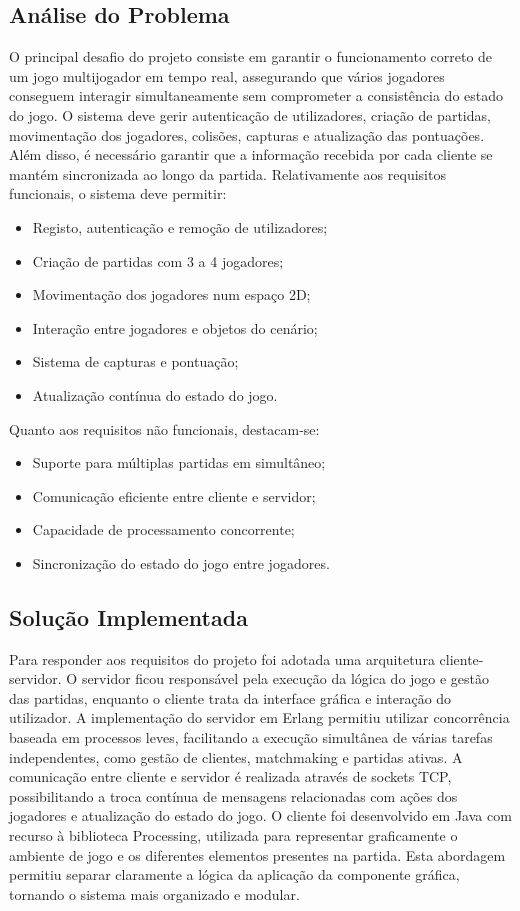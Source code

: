 \documentclass[11pt,a4paper]{article}
\begin{document}
\subsection{Análise do Problema}
O principal desafio do projeto consiste em garantir o funcionamento correto de um jogo multijogador em tempo real, assegurando que vários jogadores conseguem interagir simultaneamente sem comprometer a consistência do estado do jogo.
O sistema deve gerir autenticação de utilizadores, criação de partidas, movimentação dos jogadores, colisões, capturas e atualização das pontuações. Além disso, é necessário garantir que a informação recebida por cada cliente se mantém sincronizada ao longo da partida.
Relativamente aos requisitos funcionais, o sistema deve permitir:
\begin{itemize}
    \item Registo, autenticação e remoção de utilizadores;
    \item Criação de partidas com 3 a 4 jogadores;
    \item Movimentação dos jogadores num espaço 2D;
    \item Interação entre jogadores e objetos do cenário;
    \item Sistema de capturas e pontuação;
    \item Atualização contínua do estado do jogo.
\end{itemize}
Quanto aos requisitos não funcionais, destacam-se:
\begin{itemize}
    \item Suporte para múltiplas partidas em simultâneo;
    \item Comunicação eficiente entre cliente e servidor;
    \item Capacidade de processamento concorrente;
    \item Sincronização do estado do jogo entre jogadores.
\end{itemize}



\subsection{Solução Implementada}
Para responder aos requisitos do projeto foi adotada uma arquitetura cliente-servidor. O servidor ficou responsável pela execução da lógica do jogo e gestão das partidas, enquanto o cliente trata da interface gráfica e interação do utilizador.
A implementação do servidor em Erlang permitiu utilizar concorrência baseada em processos leves, facilitando a execução simultânea de várias tarefas independentes, como gestão de clientes, matchmaking e partidas ativas.
A comunicação entre cliente e servidor é realizada através de sockets TCP, possibilitando a troca contínua de mensagens relacionadas com ações dos jogadores e atualização do estado do jogo.
O cliente foi desenvolvido em Java com recurso à biblioteca Processing, utilizada para representar graficamente o ambiente de jogo e os diferentes elementos presentes na partida.
Esta abordagem permitiu separar claramente a lógica da aplicação da componente gráfica, tornando o sistema mais organizado e modular.
\end{document}
